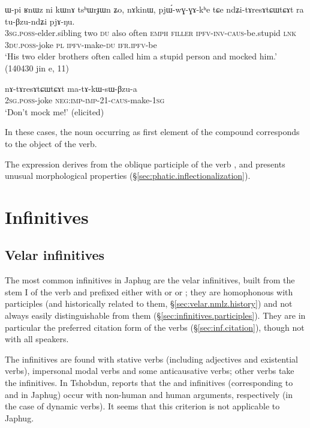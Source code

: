 \begin{exe}
\ex \label{ex:ndZitAresAtCWtCAt}
\gll ɯ-pi ʁnɯz ni kɯnɤ tsʰɯrɟɯn ʑo, nɤkinɯ, pjɯ́-wɣ-ɣɤ-kʰe tɕe ndʑi-tɤresɤtɕɯtɕɤt ra tu-βzu-ndʑi pjɤ-ŋu. \\
\textsc{3sg}.\textsc{poss}-elder.sibling two \textsc{du} also often \textsc{emph} \textsc{filler} \textsc{ipfv}-\textsc{inv}-\textsc{caus}-be.stupid \textsc{lnk} \textsc{3du}.\textsc{poss}-joke \textsc{pl} \textsc{ipfv}-make-\textsc{du} \textsc{ifr}.\textsc{ipfv}-be \\
\glt `His two elder brothers often called him a stupid person and mocked him.' (140430 jin e, 11)
\end{exe}

\begin{exe}
\ex \label{ex:nAtAresAtCWtCAt}
\gll nɤ-tɤresɤtɕɯtɕɤt ma-tɤ-kɯ-sɯ-βzu-a  \\
\textsc{2sg}.\textsc{poss}-joke \textsc{neg}:\textsc{imp}-\textsc{imp}-2\fl{}1-\textsc{caus}-make-\textsc{1sg} \\
\glt `Don't mock me!' (elicited)
\end{exe}

In these cases, the noun occurring as first element of the compound corresponds to the object of the verb.

The expression  derives from the oblique participle of the verb , and presents unusual morphological properties (§\ref{sec:phatic.inflectionalization}).

 

\section{Infinitives} \label{sec:inf}

 
\subsection{Velar infinitives} \label{sec:velar.inf}
The most common infinitives in Japhug are the velar infinitives, built from the stem I of the verb and prefixed either with  or or ; they are homophonous with participles (and historically related to them, §\ref{sec:velar.nmlz.history}) and not always easily distinguishable from them (§\ref{sec:infinitives.participles}). They are in particular the preferred citation form of the verbs (§\ref{sec:inf.citation}), though not with all speakers.
 
The  infinitives are found with stative verbs (including adjectives and existential verbs), impersonal modal verbs and some anticausative verbs; other verbs take the  infinitives. In Tshobdun, \citet[235]{sun14generic} reports that the  and  infinitives (corresponding to  and  in Japhug) occur with non-human and human arguments, respectively (in the case of dynamic verbs). It seems that this criterion is not applicable to Japhug.

